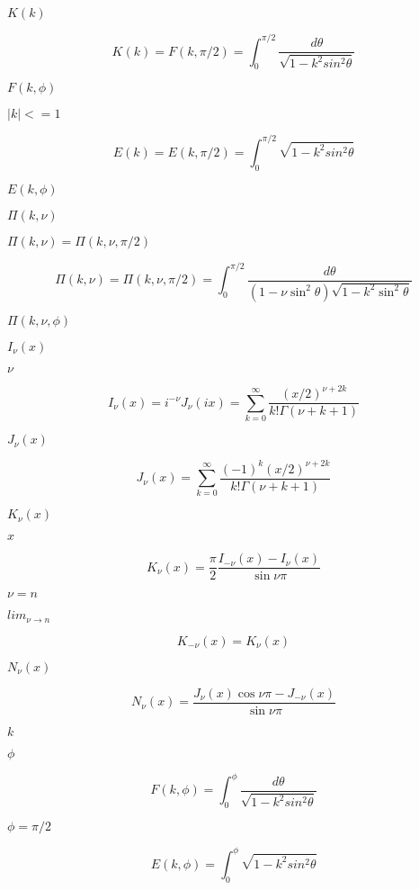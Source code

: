 \documentclass{article}
\begin{document}
$ K(k) $
\pagebreak

\[
  K(k) = F(k,\pi/2) = \int_0^{\pi/2}\frac{d\theta}
                         {\sqrt{1 - k^2 sin^2\theta}}
\]
\pagebreak

$ F(k,\phi) $
\pagebreak

$ |k| <= 1 $
\pagebreak

\[
  E(k) = E(k,\pi/2) = \int_0^{\pi/2}\sqrt{1 - k^2 sin^2\theta}
\]
\pagebreak

$ E(k,\phi) $
\pagebreak

$ \Pi(k,\nu) $
\pagebreak

$ \Pi(k,\nu) = \Pi(k,\nu,\pi/2) $
\pagebreak

\[
  \Pi(k,\nu) = \Pi(k,\nu,\pi/2) = \int_0^{\pi/2}
             \frac{d\theta}
           {(1 - \nu \sin^2\theta)\sqrt{1 - k^2 \sin^2\theta}}
\]
\pagebreak

$ \Pi(k,\nu,\phi) $
\pagebreak

$ I_{\nu}(x) $
\pagebreak

$ \nu $
\pagebreak

\[
 I_{\nu}(x) = i^{-\nu}J_\nu(ix) = \sum_{k=0}^{\infty}
        \frac{(x/2)^{\nu + 2k}}{k!\Gamma(\nu+k+1)}
\]
\pagebreak

$ J_{\nu}(x) $
\pagebreak

\[
   J_{\nu}(x) = \sum_{k=0}^{\infty}
             \frac{(-1)^k (x/2)^{\nu + 2k}}{k!\Gamma(\nu+k+1)}
\]
\pagebreak

$ K_{\nu}(x) $
\pagebreak

$ x $
\pagebreak

\[
    K_{\nu}(x) = \frac{\pi}{2}
             \frac{I_{-\nu}(x) - I_{\nu}(x)}{\sin \nu\pi}
\]
\pagebreak

$ \nu = n $
\pagebreak

$ lim_{\nu \to n} $
\pagebreak

\[
    K_{-\nu}(x) = K_{\nu}(x)
\]
\pagebreak

$ N_{\nu}(x) $
\pagebreak

\[
   N_{\nu}(x) = \frac{J_{\nu}(x) \cos \nu\pi - J_{-\nu}(x)}
                     {\sin \nu\pi}
\]
\pagebreak

$ k $
\pagebreak

$ \phi $
\pagebreak

\[
  F(k,\phi) = \int_0^{\phi}\frac{d\theta}
                     {\sqrt{1 - k^2 sin^2\theta}}
\]
\pagebreak

$ \phi= \pi/2 $
\pagebreak

\[
  E(k,\phi) = \int_0^{\phi} \sqrt{1 - k^2 sin^2\theta}
\]
\pagebreak
\end{document}
